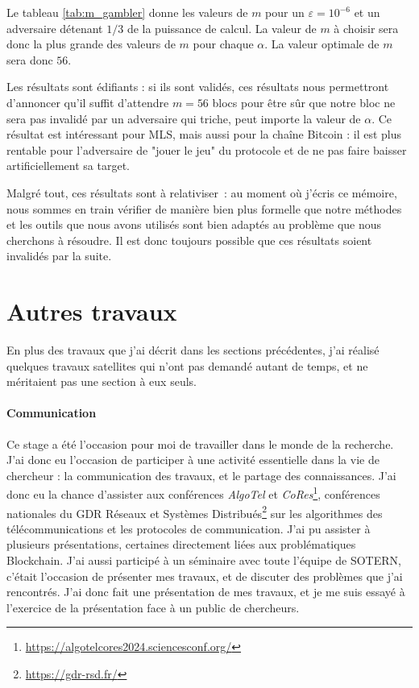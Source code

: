 	Le tableau \ref{tab:m_gambler} donne les valeurs de $m$ pour un $\varepsilon =
	10^{-6}$ et un adversaire détenant $1/3$ de la puissance de calcul. La valeur
	de $m$ à choisir sera donc la plus grande des valeurs de $m$ pour chaque
	$\alpha$. La valeur optimale de $m$ sera donc $56$. 
	
	Les résultats sont édifiants : si ils sont validés, ces résultats nous
	permettront d'annoncer qu'il suffit d'attendre $m = 56$ blocs pour être sûr
	que notre bloc ne sera pas invalidé par un adversaire qui triche, peut importe
	la valeur de $\alpha$. Ce résultat est intéressant pour MLS, mais aussi pour
	la chaîne Bitcoin : il est plus rentable pour l'adversaire de "jouer le jeu"
	du protocole et de ne pas faire baisser artificiellement sa target.

	Malgré tout, ces résultats sont à relativiser~: au moment où j'écris ce
	mémoire, nous sommes en train vérifier de manière bien plus formelle que notre
	méthodes et les outils que nous avons utilisés sont bien adaptés au problème
	que nous cherchons à résoudre. Il est donc toujours possible que ces résultats
	soient invalidés par la suite.


\section{Autres travaux}\label{sec:autres-travaux}

	En plus des travaux que j'ai décrit dans les sections précédentes, j'ai
	réalisé quelques travaux satellites qui n'ont pas demandé autant de temps, et
	ne méritaient pas une section à eux seuls.
	
	\paragraph{Communication} Ce stage a été l'occasion pour moi de travailler
	dans le monde de la recherche. J'ai donc eu l'occasion de participer à une
	activité essentielle dans la vie de chercheur : la communication des travaux,
	et le partage des connaissances. J'ai donc eu la chance d'assister aux
	conférences \textit{AlgoTel} et
	\textit{CoRes}\footnote{\url{https://algotelcores2024.sciencesconf.org/}},
	conférences nationales du GDR Réseaux et Systèmes
	Distribués\footnote{\url{https://gdr-rsd.fr/}} sur les algorithmes des
	télécommunications et les protocoles de communication. J'ai pu assister à
	plusieurs présentations, certaines directement liées aux problématiques
	Blockchain. J'ai aussi participé à un séminaire avec toute l'équipe de SOTERN,
	c'était l'occasion de présenter mes travaux, et de discuter des problèmes que
	j'ai rencontrés. J'ai donc fait une présentation de mes travaux, et je me suis
	essayé à l'exercice de la présentation face à un public de chercheurs.
 
